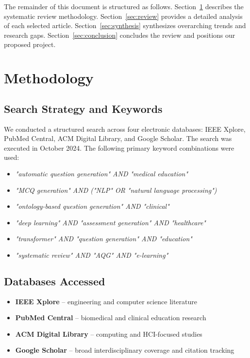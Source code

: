 \documentclass[conference]{IEEEtran}
\begin{document}
The remainder of this document is structured as follows. Section~\ref{sec:methodology} describes the systematic review methodology. Section~\ref{sec:review} provides a detailed analysis of each selected article. Section~\ref{sec:synthesis} synthesizes overarching trends and research gaps. Section~\ref{sec:conclusion} concludes the review and positions our proposed project.

\section{Methodology}
\label{sec:methodology}

\subsection{Search Strategy and Keywords}

We conducted a structured search across four electronic databases: IEEE Xplore, PubMed Central, ACM Digital Library, and Google Scholar. The search was executed in October 2024. The following primary keyword combinations were used:

\begin{itemize}
    \item \textit{"automatic question generation" AND "medical education"}
    \item \textit{"MCQ generation" AND ("NLP" OR "natural language processing")}
    \item \textit{"ontology-based question generation" AND "clinical"}
    \item \textit{"deep learning" AND "assessment generation" AND "healthcare"}
    \item \textit{"transformer" AND "question generation" AND "education"}
    \item \textit{"systematic review" AND "AQG" AND "e-learning"}
\end{itemize}

\subsection{Databases Accessed}

\begin{itemize}
    \item \textbf{IEEE Xplore} – engineering and computer science literature
    \item \textbf{PubMed Central} – biomedical and clinical education research
    \item \textbf{ACM Digital Library} – computing and HCI-focused studies
    \item \textbf{Google Scholar} – broad interdisciplinary coverage and citation tracking
\end{itemize}
\end{document}
